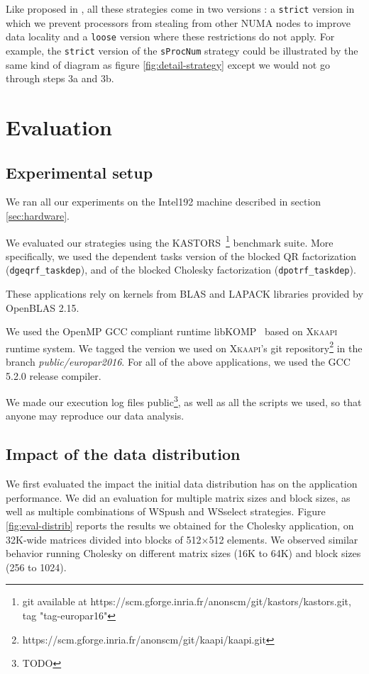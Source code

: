 \documentclass{Styles/llncs}
\newcommand{\kaapi}{\textsc{\mbox{Xkaapi}}\xspace}
\begin{document}
Like proposed in \cite{Olivier:2012:CMW:2388996.2389085}, all these strategies come in two versions : a \verb!strict! version in which we prevent processors from stealing from other NUMA nodes to improve data locality and a \verb!loose! version where these restrictions do not apply.
For example, the \verb!strict! version of the \verb!sProcNum! strategy could be illustrated by the same kind of diagram as figure \ref{fig:detail-strategy} except we would not go through steps 3a and 3b.

\section{Evaluation}
\label{sec:performances-evaluation}

\subsection{Experimental setup}

We ran all our experiments on the Intel192 machine described in section \ref{sec:hardware}.

We evaluated our strategies using the KASTORS~\cite{virouleau:hal-01081974}\footnote{git available at https://scm.gforge.inria.fr/anonscm/git/kastors/kastors.git, tag "tag-europar16"} benchmark suite.
More specifically, we used the dependent tasks version of the blocked QR factorization
(\verb/dgeqrf_taskdep/), and of the blocked Cholesky factorization (\verb/dpotrf_taskdep/).

These applications rely on kernels from BLAS and LAPACK libraries provided by OpenBLAS 2.15.

We used the OpenMP GCC compliant runtime libKOMP~\cite{libkomp} based on \kaapi runtime system. We tagged the version we used on \kaapi's
git repository\footnote{https://scm.gforge.inria.fr/anonscm/git/kaapi/kaapi.git } in the branch \emph{public/europar2016}.
For all of the above applications, we used the GCC 5.2.0 release compiler.

We made our execution log files public\footnote{TODO}, as well as all the scripts we used, so that
anyone may reproduce our data analysis.

\subsection{Impact of the data distribution}

We first evaluated the impact the initial data distribution has on the application performance. We did an evaluation for multiple matrix sizes and block sizes,
as well as multiple combinations of WSpush and WSselect strategies. Figure \ref{fig:eval-distrib} reports the
results we obtained for the Cholesky application, on 32K-wide matrices divided into blocks of 512$\times$512 elements. We observed similar behavior running Cholesky on different matrix sizes (16K to 64K) and block sizes (256 to 1024).
\end{document}
